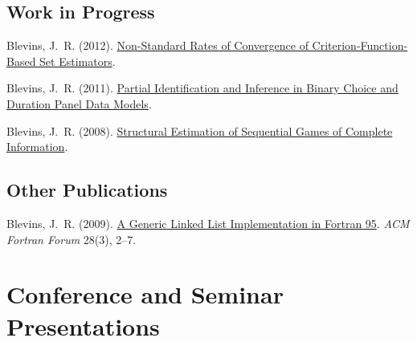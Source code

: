 \documentclass[10pt,letterpaper]{article}
\renewenvironment{itemize}{
  \begin{list}{}{
    \setlength{\leftmargin}{1.5em}
    \setlength{\itemsep}{0.25em}
    \setlength{\parskip}{0pt}
    \setlength{\parsep}{0.25em}
  }
}{
  \end{list}
}
\begin{document}
\subsection*{Work in Progress}

\begin{itemize}
\item Blevins, J.~R. (2012).
  \href{http://jblevins.org/research/cuberoot}{Non-Standard Rates of Convergence of Criterion-Function-Based Set Estimators}.
\item Blevins, J.~R. (2011).
  \href{http://jblevins.org/research/panel}{Partial Identification and Inference in Binary Choice and Duration Panel Data Models}.
\item Blevins, J.~R. (2008).
  \href{http://jblevins.org/research/seqgame}{Structural Estimation of Sequential Games of Complete Information}.
\end{itemize}

%

\subsection*{Other Publications}

\begin{itemize}

\item Blevins, J.~R. (2009).
  \href{http://jblevins.org/research/generic-list}{A Generic Linked List Implementation in Fortran 95}.
  \textit{ACM Fortran Forum} 28(3), 2--7.

\end{itemize}

\section*{Conference and Seminar Presentations}
\end{document}
